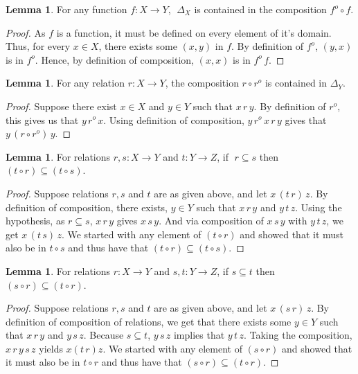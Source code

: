 \documentclass[18pt,a4paper]{article}
\theoremstyle{definition}
\newtheorem{lemma}[theorem]{Lemma}
\begin{document}
		\begin{lemma}
			For any function $f:X \to Y$, $\; \Delta_X$ is contained in the composition $ f^o \circ f$.
		\end{lemma}
		\begin{proof}\setcounter{equation}{0}

			As $f$ is a function, it must be defined on every element of it's domain. Thus, for every
			$x \in X$, there exists some $(x,y)$ in $f$. By definition of $f^o$, $(y,x)$ is in $f^o$.
			Hence, by definition of composition, $(x,x)$ is in $f^o \,f$.
		\end{proof}
		\begin{lemma}
			For any relation $r:X \to Y$, the composition $r\circ r^o$ is contained in $\Delta_Y$.
		\end{lemma}
		\begin{proof}\setcounter{equation}{0}

			Suppose there exist $x \in X$ and $y \in Y$ such that
			$x\,r\,y$. By definition of $r^o$, this
			gives us that $y\, r^o \,x$. Using definition of composition,
			$y\, r^o \,x \,r\,y$ gives that	$y\, (r \circ r^o)\, y$.
		\end{proof}
		\begin{lemma} For relations $r,s:X\to Y$ and $t:Y\to Z$, if $\;r \subseteq s$ then $(t \circ r) \subseteq (t \circ s)$.
		\end{lemma}
		\begin{proof}\setcounter{equation}{0}

			Suppose relations $r,s$ and $t$ are as given above, and let $x \,(t \, r)\,z$.
			By definition of composition, there
			exists, $y \in Y$ such that $x\,r\,y$ and $y\,t\,z$.
			Using the hypothesis, as $r \subseteq  s $,
			$x\,r\,y$ gives $x\,s\,y$. And via composition of $x\,s\,y$ with $y \, t \, z $, we get
			$x\,(t\,s)\, z$. We started with any element of $(t \circ r)$ and showed that
			it must also be in $t \circ s$ and thus have that $(t \circ r) \subseteq (t \circ s)$.
		\end{proof}
		\begin{lemma} For relations $r:X\to Y$ and $s,t:Y\to Z$, if $s\subseteq t$ then
			$(s \circ r) \subseteq (t \circ r)$.
		\end{lemma}
		\begin{proof}\setcounter{equation}{0}

			Suppose relations $r,s$ and $t$ are as given above, and let  $x \,(s \, r)\,z$.
			By definition of composition of relations, we get that there exists
			some $y \in Y$ such that $x\,r\,y$ and $y\,s\,z$. Because $s \subseteq t$, $y\,s\,z$
			implies that $y\,t\,z$. Taking the composition, $x\,r\,y\,s\,z$ yields $x(t\,r)z$.
			We started with any element of $(s \circ r)$ and showed that it must also be in
			$t \circ r$ and thus have that $(s \circ r) \subseteq (t \circ r)$.
		\end{proof}
\end{document}
